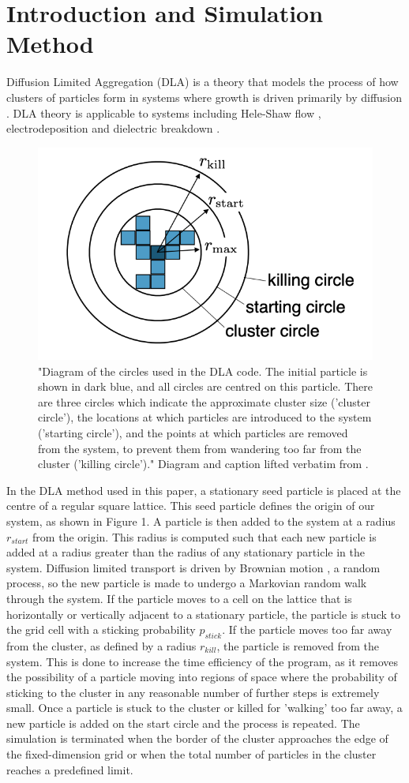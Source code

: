 \documentclass[11pt]{iopart}
\begin{document}
\section{Introduction and Simulation Method}

Diffusion Limited Aggregation (DLA) is a theory that models the process of how clusters of particles form in systems where growth is driven primarily by diffusion \cite{dla}. DLA theory is applicable to systems including Hele-Shaw flow \cite{heleshaw}, electrodeposition \cite{electrodeposition} and dielectric breakdown \cite{electricbreakdown}.

\begin{figure}[b]
  \centering
  \includegraphics[width=0.4\linewidth]{images/circles.png}
  \caption{"Diagram of the circles used in the DLA code. The initial particle is shown in dark blue, and all circles are centred on this particle. There are three circles which indicate the approximate cluster size ('cluster circle'), the locations at which particles are introduced to the system ('starting circle'), and the points at which particles are removed from the system, to prevent them from wandering too far from the cluster ('killing circle')." Diagram and caption lifted verbatim from \cite{handout}.}
  \label{fig:circles}
\end{figure}

In the DLA method used in this paper, a stationary seed particle is placed at the centre of a regular square lattice. This seed particle defines the origin of our system, as shown in Figure 1. A particle is then added to the system at a radius $r_{start}$ from the origin. This radius is computed such that each new particle is added at a radius greater than the radius of any stationary particle in the system. Diffusion limited transport is driven by Brownian motion \cite{brownian}, a random process, so the new particle is made to undergo a Markovian random walk through the system. If the particle moves to a cell on the lattice that is horizontally or vertically adjacent to a stationary particle, the particle is stuck to the grid cell with a sticking probability $p_{stick}$. If the particle moves too far away from the cluster, as defined by a radius $r_{kill}$, the particle is removed from the system. This is done to increase the time efficiency of the program, as it removes the possibility of a particle moving into regions of space where the probability of sticking to the cluster in any reasonable number of further steps is extremely small. Once a particle is stuck to the cluster or killed for 'walking' too far away, a new particle is added on the start circle and the process is repeated. The simulation is terminated when the border of the cluster approaches the edge of the fixed-dimension grid or when the total number of particles in the cluster reaches a predefined limit.
\end{document}
